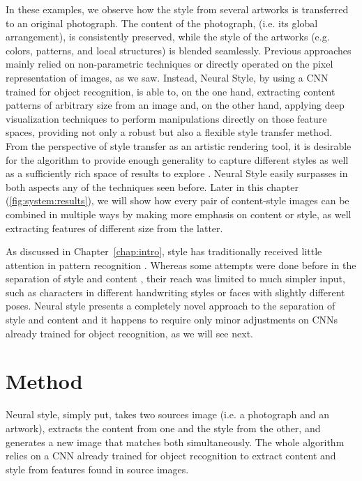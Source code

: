 In these examples, we observe how the style from several artworks is transferred to an original photograph.
The content of the photograph, (i.e. its global arrangement), is consistently preserved, while the style of the artworks (e.g. colors, patterns, and local structures) is blended seamlessly.
Previous approaches mainly relied on non-parametric techniques or directly operated on the pixel representation of images, as we saw.
Instead, Neural Style, by using a CNN trained for object recognition, is able to, on the one hand, extracting content patterns of arbitrary size from an image and, on the other hand, applying deep visualization techniques to perform manipulations directly on those feature spaces, providing not only a robust but also a flexible style transfer method.
From the perspective of style transfer as an artistic rendering tool, it is desirable for the algorithm to provide enough generality to capture different styles as well as a sufficiently rich space of results to explore \cite{Ashikhmin2003}.
Neural Style easily surpasses in both aspects any of the techniques seen before.
Later in this chapter (\autoref{fig:system:results}), we will show how every pair of content-style images can be combined in multiple ways by making more emphasis on content or style, as well extracting features of different size from the latter.

As discussed in Chapter~\ref{chap:intro}, style has traditionally received little attention in pattern recognition \cite{Karayev2014}.
Whereas some attempts were done before in the separation of style and content \cite{Tenenbaum2000,Elgammal2004}, their reach was limited to much simpler input, such as characters in different handwriting styles or faces with slightly different poses.
Neural style presents a completely novel approach to the separation of style and content and it happens to require only minor adjustments on CNNs already trained for object recognition, as we will see next.



\section{Method}
\label{sec:system:method}

Neural style, simply put, takes two sources image (i.e. a photograph and an artwork), extracts the content from one and the style from the other, and generates a new image that matches both simultaneously.
The whole algorithm relies on a CNN already trained for object recognition to extract content and style from features found in source images.

